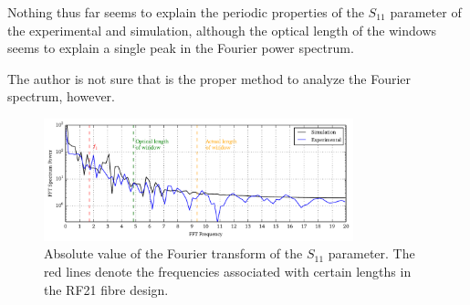 Nothing thus far seems to explain the periodic properties of the 
$S_{11}$ parameter of the experimental and simulation, although
the optical length of the windows seems to explain a single 
peak in the Fourier power spectrum. 

The author is not sure that is the proper method to
analyze the Fourier spectrum, however.

\begin{figure}
 \centering
 \includegraphics[width=0.8\textwidth]{figs/active/fourierAnalysisS11.pdf}
 \caption[Fourier Power Spectrum]
	  {Absolute value of the Fourier transform of the $S_{11}$ parameter.
	  The red lines denote the frequencies associated with certain lengths
	  in the RF21 fibre design.}
 \label{fig:antenna.fourierAnalysis}
\end{figure}



% 
% 	      
% 
% 
% 
